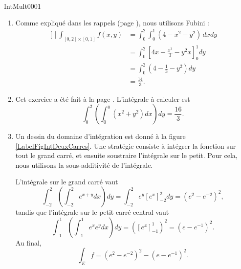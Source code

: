 
\begin{corrige}{IntMult0001}

\begin{enumerate}

\item
Comme expliqué dans les rappels (page \pageref{PgRapIntMultFubiniRect}), nous utilisons Fubini :
\begin{equation}
	\begin{aligned}[]
	\int_{[0,2]\times[0,1]}f(x,y)&=\int_0^2\int_0^1(4-x^2-y^2)\,dxdy\\
			&=\int_0^2\left[ 4x-\frac{ x^3 }{ 3 }-y^2x \right]_0^1dy\\
			&=\int_0^2\left( 4-\frac{1}{ 3 }-y^2 \right)dy\\
			&=\frac{ 14 }{ 3 }.
	\end{aligned}
\end{equation}

\item
Cet exercice a été fait à la page \pageref{PgRapIntMultFubiniTri}. L'intégrale à calculer est
\begin{equation}
	\int_0^2\left( \int_0^y(x^2+y^2)dx \right)dy=\frac{ 16 }{ 3 }.
\end{equation}

\item
Un dessin du domaine d'intégration est donné à la figure \ref{LabelFigIntDeuxCarres}. Une stratégie consiste à intégrer la fonction sur tout le grand carré, et ensuite soustraire l'intégrale sur le petit. Pour cela, nous utilisons la sous-additivité de l'intégrale.
\newcommand{\CaptionFigIntDeuxCarres}{Un domaine d'intégration.}

L'intégrale sur le grand carré vaut
\begin{equation}
		\int_{-2}^2\left( \int_{-2}^2 e^{x+y}dx \right)dy=\int_{-2}^2e^y[e^x]_{-2}^2dy=(e^2- e^{-2})^2,
\end{equation}
tandis que l'intégrale sur le petit carré central vaut
\begin{equation}
		\int_{-1}^1\left( \int_{-1}^1 e^xe^ydx \right)dy=\left( [e^x]_{-1}^1 \right)^2=\left( e-e^{-1} \right)^2.
\end{equation}
Au final,
\begin{equation}
	\int_Ef=(e^2-e^{-2})^2-(e-e^{-1})^2.
\end{equation}


\end{enumerate}
\end{corrige}

